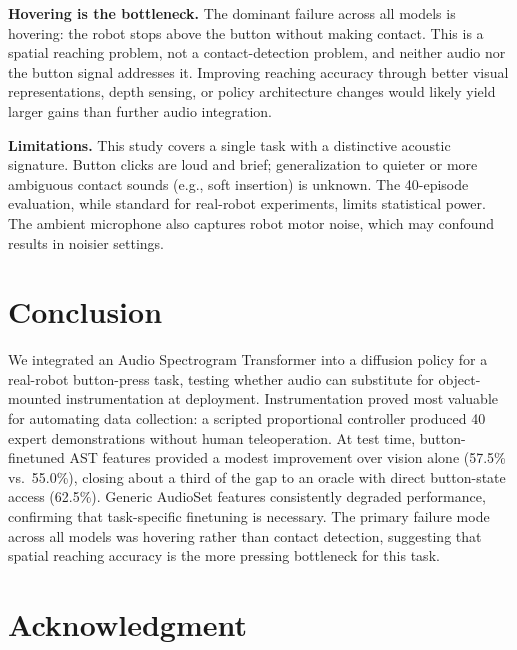 \documentclass[conference]{IEEEtran}
\begin{document}
\textbf{Hovering is the bottleneck.}
The dominant failure across all models is hovering: the robot stops above the button without making contact.
This is a spatial reaching problem, not a contact-detection problem, and neither audio nor the button signal addresses it.
Improving reaching accuracy through better visual representations, depth sensing, or policy architecture changes would likely yield larger gains than further audio integration.

\textbf{Limitations.}
This study covers a single task with a distinctive acoustic signature.
Button clicks are loud and brief; generalization to quieter or more ambiguous contact sounds (e.g., soft insertion) is unknown.
The 40-episode evaluation, while standard for real-robot experiments, limits statistical power.
The ambient microphone also captures robot motor noise, which may confound results in noisier settings.

\section{Conclusion}

We integrated an Audio Spectrogram Transformer into a diffusion policy for a real-robot button-press task, testing whether audio can substitute for object-mounted instrumentation at deployment.
Instrumentation proved most valuable for automating data collection: a scripted proportional controller produced 40 expert demonstrations without human teleoperation.
At test time, button-finetuned AST features provided a modest improvement over vision alone (57.5\% vs.\ 55.0\%), closing about a third of the gap to an oracle with direct button-state access (62.5\%).
Generic AudioSet features consistently degraded performance, confirming that task-specific finetuning is necessary.
The primary failure mode across all models was hovering rather than contact detection, suggesting that spatial reaching accuracy is the more pressing bottleneck for this task.

\section*{Acknowledgment}

\end{document}
